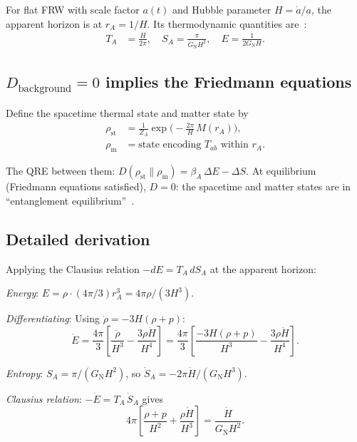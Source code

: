 \documentclass[aps,prd,preprint,superscriptaddress,longbibliography]{revtex4-2}
\newcommand{\KL}{D}
\newcommand{\GN}{G_{\mathrm{N}}}
\begin{document}
For flat FRW with scale factor $a(t)$ and Hubble parameter
$H = \dot{a}/a$, the apparent horizon is at $r_A = 1/H$.  Its
thermodynamic quantities are~\cite{CaiKim2005}:
\begin{align}
T_A &= \frac{H}{2\pi},
\quad
S_A = \frac{\pi}{\GN H^2},
\quad
E = \frac{1}{2\GN H}.
\label{eq:CK_thermo}
\end{align}

\subsection{$\KL_{\mathrm{background}} = 0$ implies the Friedmann equations}

Define the spacetime thermal state and matter state by
\begin{align}
\rho_{\mathrm{st}} &= \frac{1}{Z_A}
\exp\!\Big(-\frac{2\pi}{H}\,M(r_A)\Big),\\
\rho_{\mathrm{m}} &= \text{state encoding }T_{ab}\text{ within }r_A.
\end{align}

The QRE between them:
$\KL(\rho_{\mathrm{st}}\|\rho_{\mathrm{m}})
= \beta_A\,\Delta E - \Delta S$.  At equilibrium
(Friedmann equations satisfied), $\KL = 0$: the spacetime and matter
states are in ``entanglement equilibrium''~\cite{Jacobson2016}.

\subsection{Detailed derivation}

Applying the Clausius relation $-dE = T_A\,dS_A$ at the apparent
horizon:

\emph{Energy}: $E = \rho\cdot(4\pi/3)r_A^3 = 4\pi\rho/(3H^3)$.

\emph{Differentiating}: Using $\dot{\rho} = -3H(\rho+p)$:
\begin{equation}
\dot{E} = \frac{4\pi}{3}\left[\frac{\dot{\rho}}{H^3}
- \frac{3\rho\dot{H}}{H^4}\right]
= \frac{4\pi}{3}\left[\frac{-3H(\rho+p)}{H^3}
- \frac{3\rho\dot{H}}{H^4}\right].
\end{equation}

\emph{Entropy}: $S_A = \pi/(\GN H^2)$, so
$\dot{S}_A = -2\pi\dot{H}/(\GN H^3)$.

\emph{Clausius relation}: $-\dot{E} = T_A\,\dot{S}_A$ gives
\begin{equation}
4\pi\!\left[\frac{\rho+p}{H^2} + \frac{\rho\dot{H}}{H^3}\right]
= \frac{\dot{H}}{\GN H^2}.
\end{equation}
\end{document}
